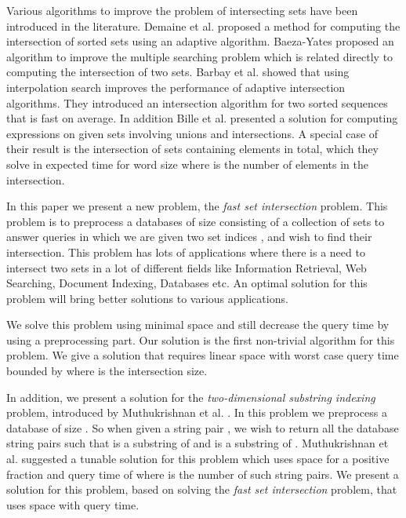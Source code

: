 \documentclass[10pt]{llncs}
\begin{document}
Various algorithms to improve the problem of intersecting sets have been introduced in the literature.
Demaine et al. \cite{Demaine00adaptiveset} proposed a method
for computing the intersection of  sorted sets using an adaptive algorithm.
Baeza-Yates \cite{Baeza04} proposed an algorithm to improve the multiple searching problem
which is related directly to computing the intersection of two sets.
Barbay et al. \cite{Barbay06fasteradaptive} showed that using
interpolation search improves the performance of adaptive intersection algorithms.
They introduced an intersection algorithm for two sorted sequences that is fast on average.
In addition Bille et al. \cite{Philip07} presented a solution for computing expressions on given sets
involving unions and intersections.
A special case of their result is the intersection of  sets containing  elements in total,
which they solve in expected time 
for word size 
where  is the number of elements in the intersection.

In this paper we present a new problem, the \emph{fast set intersection} problem.
This problem is to preprocess a databases of size 
consisting of a collection of  sets
to answer queries in which we are given two set indices ,
and wish to find their intersection.
This problem has lots of applications where there is a need to intersect two sets
in a lot of different fields
like Information Retrieval, Web Searching, Document Indexing, Databases etc.
An optimal solution for this problem will bring better solutions to various applications.

We solve this problem using minimal space and still decrease the query time
by using a preprocessing part.
Our solution is the first non-trivial algorithm for this problem.
We give a solution that requires linear space
with worst case query time bounded by 
where  is the intersection size.

In addition, we present a solution
for the \emph{two-dimensional substring indexing} problem,
introduced by Muthukrishnan et al. \cite{Muthu01}.
In this problem we preprocess a database  of size .
So when given a string pair ,
we wish to return all the database string pairs 
such that  is a substring of 
and  is a substring of .
Muthukrishnan et al. suggested a tunable solution for this problem which
uses  space for a positive fraction 
and query time of  where  is the number of such string pairs.
We present a solution for this problem, based on solving the \emph{fast set intersection} problem,
that uses  space
with  query time.
\end{document}
